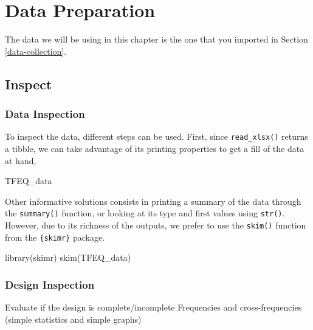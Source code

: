 \documentclass[
]{book}
\newenvironment{Shaded}{\begin{snugshade}}{\end{snugshade}}
\newcommand{\FunctionTok}[1]{\textcolor[rgb]{0.00,0.00,0.00}{#1}}
\newcommand{\NormalTok}[1]{#1}
\begin{document}
\hypertarget{data-prep}{%
\chapter{Data Preparation}\label{data-prep}}

The data we will be using in this chapter is the one that you imported in Section \ref{data-collection}.

\hypertarget{inspect}{%
\section{Inspect}\label{inspect}}

\hypertarget{data-inspection}{%
\subsection{Data Inspection}\label{data-inspection}}

To inspect the data, different steps can be used.
First, since \texttt{read\_xlsx()} returns a tibble, we can take advantage of its printing properties to get a fill of the data at hand,

\begin{Shaded}
\begin{Highlighting}[]
\NormalTok{TFEQ\_data}
\end{Highlighting}
\end{Shaded}

Other informative solutions consists in printing a summary of the data through the \texttt{summary()} function, or looking at its type and first values using \texttt{str()}. However, due to its richness of the outputs, we prefer to use the \texttt{skim()} function from the \texttt{\{skimr\}} package.

\begin{Shaded}
\begin{Highlighting}[]
\FunctionTok{library}\NormalTok{(skimr)}
\FunctionTok{skim}\NormalTok{(TFEQ\_data)}
\end{Highlighting}
\end{Shaded}

\hypertarget{design-inspection}{%
\subsection{Design Inspection}\label{design-inspection}}

Evaluate if the design is complete/incomplete
Frequencies and cross-frequencies (simple statistics and simple graphs)
\end{document}

